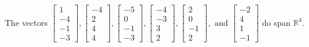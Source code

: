 \begin{exercise}
\begin{exerciseStatement}
  \end{exerciseStatement}
  \begin{exerciseAnswer}
   The vectors \(\left[\begin{array}{r}
1 \\
-4 \\
-1 \\
-3
\end{array}\right] , \left[\begin{array}{r}
-4 \\
2 \\
4 \\
4
\end{array}\right] , \left[\begin{array}{r}
-5 \\
0 \\
-1 \\
-3
\end{array}\right] , \left[\begin{array}{r}
-4 \\
-3 \\
3 \\
2
\end{array}\right] , \left[\begin{array}{r}
2 \\
0 \\
-1 \\
2
\end{array}\right] , \text{ and } \left[\begin{array}{r}
-2 \\
4 \\
1 \\
-1
\end{array}\right]\) 
  	 do  
	span \(\mathbb{R}^4\).
  


  \end{exerciseAnswer}
\end{exercise}